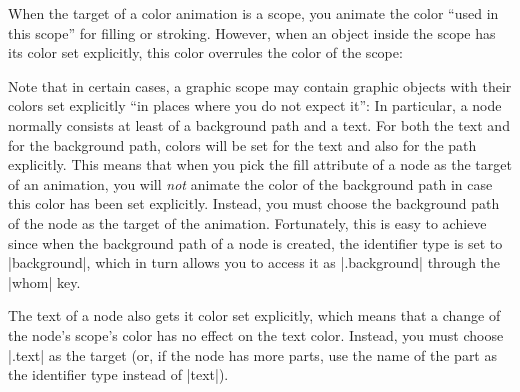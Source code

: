 When the target of a color animation is a scope, you animate
the color ``used in this scope'' for filling or stroking. However,
when an object inside the scope has its color set explicitly, this
color overrules the color of the scope:

\begin{codeexample}[]
\end{codeexample}

Note that in certain cases, a graphic scope may contain graphic
objects with their colors set explicitly ``in places where you do not
expect it'': In particular, a node normally consists at least of a
background path and a text. For both the text and for the background
path, colors will be set for the text and also for the path
explicitly. This means that when you pick the fill attribute of a node
as the target of an animation, you will \emph{not} animate the color
of the background path in case this color has been set
explicitly. Instead, you must choose the background path of the node
as the target of the animation. Fortunately, this is easy to achieve
since when the background path of a node is created, the identifier
type is set to |background|, which in turn allows you to access it as
|.background| through the |whom| key.

The text of a node also gets it color set explicitly, which means that
a change of the node's scope's color has no effect on the text
color. Instead, you must choose |.text| as the target (or,
if the node has more parts, use the name of the part as the identifier
type instead of |text|).

\begin{codeexample}[]
\end{codeexample}


\begin{codeexample}[]
\end{codeexample}


